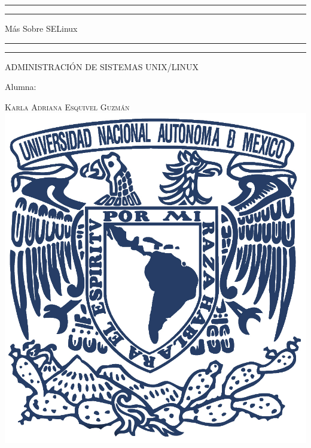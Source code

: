 \documentclass[a4paper, 11pt, oneside]{article}
\begin{document}
 

\begin{titlepage} 

	\centering 
	
	\scshape 
	
	\vspace*{\baselineskip} 
	
	
	
	\rule{\textwidth}{1.6pt}\vspace*{-\baselineskip}\vspace*{2pt} 
	\rule{\textwidth}{0.4pt} 
	
	\vspace{0.75\baselineskip} 
	
	{\LARGE Más Sobre SELinux}	
	\vspace{0.75\baselineskip} 
	
	\rule{\textwidth}{0.4pt}\vspace*{-\baselineskip}\vspace{3.2pt}
	\rule{\textwidth}{1.6pt} 
	
	\vspace{2\baselineskip} 
	

	ADMINISTRACIÓN DE SISTEMAS UNIX/LINUX
	
	\vspace*{3\baselineskip} 
	
	
	
	Alumna:
	
	\vspace{0.5\baselineskip} 
	
	{\scshape\Large Karla Adriana Esquivel Guzmán \\} 
	\vspace{0.5\baselineskip} 
	\vfill
	\includegraphics{unam.jpg}
	

\end{titlepage}
\end{document}
